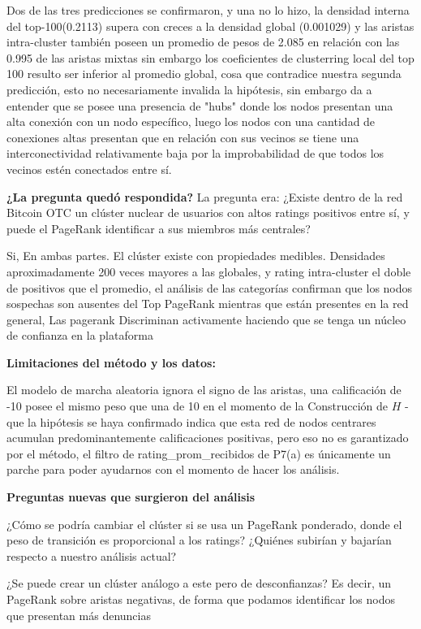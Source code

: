 \documentclass{article}
\begin{document}
Dos de las tres predicciones se confirmaron, y una no lo hizo, la densidad interna del top-100(0.2113) supera con creces a la densidad global (0.001029) y las aristas intra-cluster también poseen un promedio de pesos de 2.085 en relación con las 0.995 de las aristas mixtas sin embargo los coeficientes de clusterring local del top 100 resulto ser inferior al promedio global, cosa que contradice nuestra segunda predicción, esto no necesariamente invalida la hipótesis, sin embargo da a entender que se posee una presencia de "hubs" donde los nodos presentan una alta conexión con un nodo específico, luego los nodos con una cantidad de conexiones altas presentan que en relación con sus vecinos se tiene una interconectividad relativamente baja por la improbabilidad de que todos los vecinos estén conectados entre sí.

\textbf{¿La pregunta quedó respondida?}
La pregunta era: ¿Existe dentro de la red Bitcoin OTC un clúster nuclear de usuarios con altos ratings positivos entre sí, y puede el PageRank identificar a sus miembros más centrales?

Si, En ambas partes. El clúster existe con propiedades medibles. Densidades aproximadamente 200 veces mayores a las globales, y rating intra-cluster el doble de positivos que el promedio, el análisis de las categorías confirman que los nodos sospechas son ausentes del Top PageRank mientras que están presentes en la red general, Las pagerank Discriminan activamente haciendo que se tenga un núcleo de confianza en la plataforma

\textbf{Limitaciones del método y los datos:}

El modelo de marcha aleatoria ignora el signo de las aristas, una calificación de -10 posee el mismo peso que una de 10 en el momento de la Construcción de $H$ - que la hipótesis se haya confirmado indica que esta red de nodos centrares acumulan predominantemente calificaciones positivas, pero eso no es garantizado por el método, el filtro de rating\_prom\_recibidos de P7(a) es únicamente un parche para poder ayudarnos con el momento de hacer los análisis.


\textbf{Preguntas nuevas que surgieron del análisis}

¿Cómo se podría cambiar el clúster si se usa un PageRank ponderado, donde el peso de transición es proporcional a los ratings? ¿Quiénes subirían y bajarían respecto a nuestro análisis actual?

¿Se puede crear un clúster análogo a este pero de desconfianzas? Es decir, un PageRank sobre aristas negativas, de forma que podamos identificar los nodos que presentan más denuncias
\end{document}
